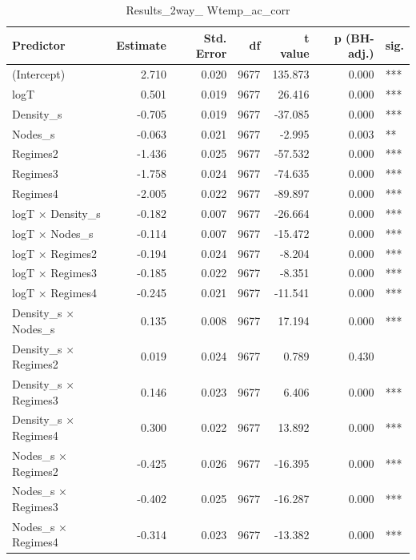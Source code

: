 \begin{table}[ht]
\centering
\begin{tabular}{lrrrrrl}
  \hline
Predictor & Estimate & Std. Error & df & t value & p (BH-adj.) & sig. \\ 
  \hline
(Intercept) & 2.710 & 0.020 & 9677 & 135.873 & 0.000 & *** \\ 
  logT & 0.501 & 0.019 & 9677 & 26.416 & 0.000 & *** \\ 
  Density\_s & -0.705 & 0.019 & 9677 & -37.085 & 0.000 & *** \\ 
  Nodes\_s & -0.063 & 0.021 & 9677 & -2.995 & 0.003 & ** \\ 
  Regimes2 & -1.436 & 0.025 & 9677 & -57.532 & 0.000 & *** \\ 
  Regimes3 & -1.758 & 0.024 & 9677 & -74.635 & 0.000 & *** \\ 
  Regimes4 & -2.005 & 0.022 & 9677 & -89.897 & 0.000 & *** \\ 
  logT × Density\_s & -0.182 & 0.007 & 9677 & -26.664 & 0.000 & *** \\ 
  logT × Nodes\_s & -0.114 & 0.007 & 9677 & -15.472 & 0.000 & *** \\ 
  logT × Regimes2 & -0.194 & 0.024 & 9677 & -8.204 & 0.000 & *** \\ 
  logT × Regimes3 & -0.185 & 0.022 & 9677 & -8.351 & 0.000 & *** \\ 
  logT × Regimes4 & -0.245 & 0.021 & 9677 & -11.541 & 0.000 & *** \\ 
  Density\_s × Nodes\_s & 0.135 & 0.008 & 9677 & 17.194 & 0.000 & *** \\ 
  Density\_s × Regimes2 & 0.019 & 0.024 & 9677 & 0.789 & 0.430 &  \\ 
  Density\_s × Regimes3 & 0.146 & 0.023 & 9677 & 6.406 & 0.000 & *** \\ 
  Density\_s × Regimes4 & 0.300 & 0.022 & 9677 & 13.892 & 0.000 & *** \\ 
  Nodes\_s × Regimes2 & -0.425 & 0.026 & 9677 & -16.395 & 0.000 & *** \\ 
  Nodes\_s × Regimes3 & -0.402 & 0.025 & 9677 & -16.287 & 0.000 & *** \\ 
  Nodes\_s × Regimes4 & -0.314 & 0.023 & 9677 & -13.382 & 0.000 & *** \\ 
   \hline
\end{tabular}
\caption{Results_2way_ Wtemp_ac_corr} 
\end{table}
